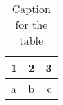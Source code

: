 \documentclass{article}
\begin{document}
	\begin{table}[h!]
		\centering
		\caption{Caption for the table}
		\label{tab:table1}
		\begin{tabular}{l|c||r}
			1 & 2 & 3\\
			\hline
			a & b & c
		\end{tabular}
	
	\end{table}
\end{document}
